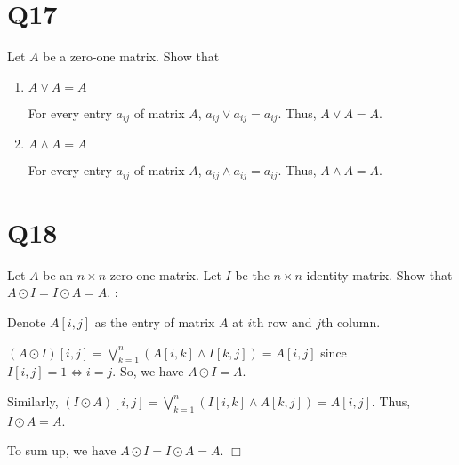 \documentclass[11pt]{article}
\newenvironment{qparts}{\begin{enumerate}[{(}a{)}]}{\end{enumerate}}
\def\endproofmark{$\Box$}
\newenvironment{proof}{{\bf Proof}:}{\endproofmark\smallskip}
\begin{document}
\section*{Q17}
Let $A$ be a zero-one matrix. Show that 
\begin{qparts}
    
    \item $A \lor A=A$

    For every entry $a_{ij}$ of matrix $A$, $a_{ij}\lor a_{ij}=a_{ij}$. Thus, 
    $A \lor A=A$.

    \item $A \land A=A$

    For every entry $a_{ij}$ of matrix $A$, $a_{ij}\land a_{ij}=a_{ij}$. Thus, 
    $A \land A=A$.
\end{qparts}

\section*{Q18}
Let $A$ be an $n \times n$ zero-one matrix. Let $I$ be the $n \times n$ identity matrix. Show that $A \odot I=I \odot A=A$.
\begin{proof}
    
    Denote $A[i,j]$ as the entry of matrix $A$ at $i$th row and $j$th column.

    $(A \odot I)[i,j]=\bigvee_{k=1}^{n}(A[i,k]\land I[k,j])=A[i,j]$ since $I[i,j]=1 \iff i=j$. So, we have $A \odot I=A$.

    Similarly, $(I \odot A)[i,j]=\bigvee_{k=1}^{n}(I[i,k]\land A[k,j])=A[i,j]$. Thus, $I \odot A=A$.

    To sum up, we have $A \odot I=I \odot A=A$.
\end{proof}
\end{document}
